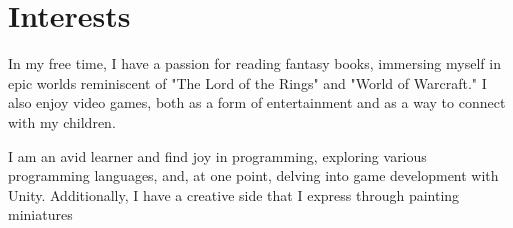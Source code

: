\documentclass[a4paper,10pt]{article}
\begin{document}
\section*{Interests}
In my free time, I have a passion for reading fantasy books, immersing myself in epic worlds reminiscent of "The Lord of the Rings" and "World of Warcraft." I also enjoy video games, both as a form of entertainment and as a way to connect with my children.

I am an avid learner and find joy in programming, exploring various programming languages, and, at one point, delving into game development with Unity. Additionally, I have a creative side that I express through painting miniatures
\end{document}
